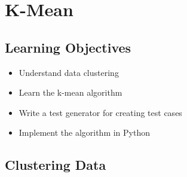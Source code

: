 \chapter{K-Mean}

\section{Learning Objectives}

\begin{itemize}

\item Understand data clustering  
  
\item Learn the k-mean algorithm

\item Write a test generator for creating test cases

\item Implement the algorithm in Python

  
\end{itemize}

\section{Clustering Data}

